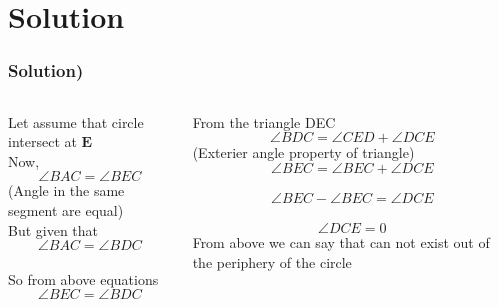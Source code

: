 \documentclass{beamer}
\renewcommand{\vec}[1]{\mathbf{#1}}
\begin{document}
\section*{\textbf{Solution}}
\begin{frame}[fragile]
	\footnotesize
	\frametitle{Solution)}
	\begin{columns}
		\begin{column}{0.5\textwidth}
			Let assume that  circle intersect at $\vec{E}$
			\\
			Now,
			\\
			$$\angle{BAC} = \angle{BEC}$$
			(Angle in the same segment are equal)
			\\
			But given that
			\\
			$$\angle{BAC} = \angle{BDC}$$
			\\
			So from above equations 
			$$\angle{BEC} = \angle{BDC}$$
			\\
		\end{column}
		\begin{column}{0.5\textwidth}
			From the triangle DEC
			$$\angle{BDC} = \angle{CED} + \angle{DCE}$$
			(Exterier angle property of triangle)
			\\
			$$\angle{BEC} = \angle{BEC} + \angle{DCE}$$
			\\
			$$\angle{BEC} - \angle{BEC} = \angle{DCE}$$
			\\
			$$\angle{DCE} = 0$$
			From above we can say that can not exist out of the periphery of the circle 
		\end{column}
	\end{columns}
\end{frame}
\end{document}
